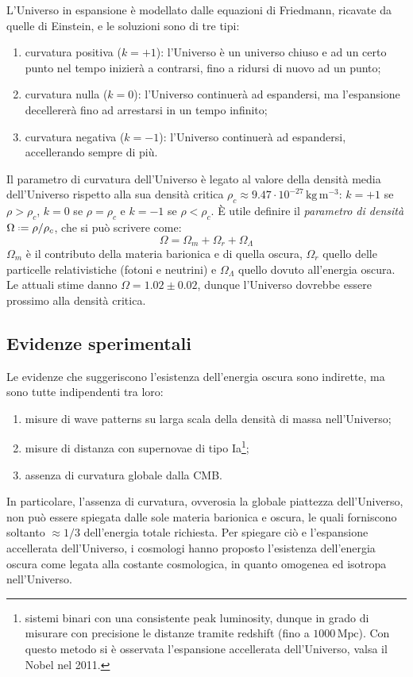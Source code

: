 L'Universo in espansione è modellato dalle equazioni di Friedmann, ricavate da quelle di Einstein, e le soluzioni sono di tre tipi:
\begin{enumerate}
	\item curvatura positiva ($ k = +1 $): l'Universo è un universo chiuso e ad un certo punto nel tempo inizierà a contrarsi, fino a ridursi di nuovo ad un punto;
	\item curvatura nulla ($ k = 0 $): l'Universo continuerà ad espandersi, ma l'espansione decellererà fino ad arrestarsi in un tempo infinito;
	\item curvatura negativa ($ k = -1 $): l'Universo continuerà ad espandersi, accellerando sempre di più.
\end{enumerate}
Il parametro di curvatura dell'Universo è legato al valore della densità media dell'Universo rispetto alla sua densità critica $ \rho_c \approx 9.47 \cdot 10^{-27} \,\text{kg} \, \text{m}^{-3} $: $ k = +1 $ se $ \rho > \rho_c $,  $ k = 0 $ se $ \rho = \rho_c $ e $ k = -1 $ se $ \rho < \rho_c $. È utile definire il \textit{parametro di densità} $ \Omega \defeq \rho / \rho_c $, che si può scrivere come:
\begin{equation}
	\Omega = \Omega_m + \Omega_r + \Omega_\Lambda
	\label{eq:11.5}
\end{equation}
$ \Omega_m $ è il contributo della materia barionica e di quella oscura, $ \Omega_r $ quello delle particelle relativistiche (fotoni e neutrini) e $ \Omega_\Lambda $ quello dovuto all'energia oscura. Le attuali stime danno $ \Omega = 1.02 \pm 0.02 $, dunque l'Universo dovrebbe essere prossimo alla densità critica.

\subsection{Evidenze sperimentali}

Le evidenze che suggeriscono l'esistenza dell'energia oscura sono indirette, ma sono tutte indipendenti tra loro:
\begin{enumerate}
	\item misure di wave patterns su larga scala della densità di massa nell'Universo;
	\item misure di distanza con supernovae di tipo Ia\footnote{sistemi binari con una consistente peak luminosity, dunque in grado di misurare con precisione le distanze tramite redshift (fino a $ 1000 \,\text{Mpc} $). Con questo metodo si è osservata l'espansione accellerata dell'Universo, valsa il Nobel nel 2011.};
	\item assenza di curvatura globale dalla CMB.
\end{enumerate}
In particolare, l'assenza di curvatura, ovverosia la globale piattezza dell'Universo, non può essere spiegata dalle sole materia barionica e oscura, le quali forniscono soltanto $ \approx 1/3 $ dell'energia totale richiesta. Per spiegare ciò e l'espansione accellerata dell'Universo, i cosmologi hanno proposto l'esistenza dell'energia oscura come legata alla costante cosmologica, in quanto omogenea ed isotropa nell'Universo.

